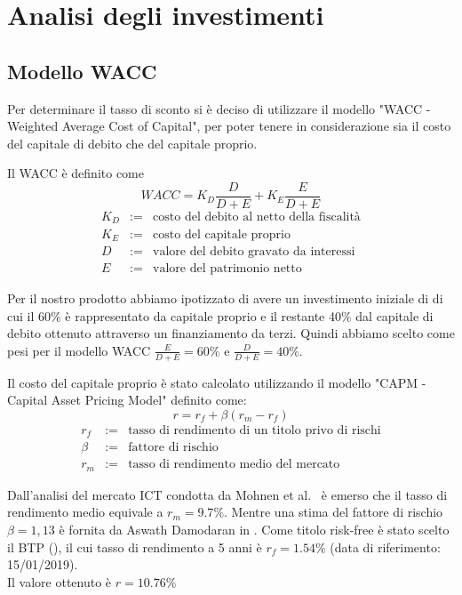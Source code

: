 \section{Analisi degli investimenti}
\subsection{Modello WACC}
Per determinare il tasso di sconto si è deciso di utilizzare il modello
"WACC - Weighted Average Cost of Capital", per poter tenere in considerazione
sia il costo del capitale di debito che del capitale proprio. 

Il WACC è definito come
\begin{displaymath}
WACC = K_D \frac{D}{D+E} + K_E \frac{E}{D+E}
\end{displaymath}
\begin{eqnarray*}
K_D &:=& \mbox{costo del debito al netto della fiscalità} \\ 
K_E &:=& \mbox{costo del capitale proprio} \\
D  &:=& \mbox{valore del debito gravato da interessi}\\
E &:=& \mbox{valore del patrimonio netto}
\end{eqnarray*}

Per il nostro prodotto abbiamo ipotizzato di avere un investimento iniziale di
 di cui il 60\% è rappresentato da capitale proprio e il restante
40\% dal capitale di debito ottenuto attraverso un finanziamento da terzi.
Quindi abbiamo scelto come pesi per il modello WACC $\frac{E}{D+E}=60\%$ e
$\frac{D}{D+E} = 40\%$.

Il costo del capitale proprio è stato calcolato utilizzando il modello "CAPM -
Capital Asset Pricing Model" definito come:
\begin{displaymath}
r = r_f + \beta (r_m - r_f )
\end{displaymath}
\begin{eqnarray*}
	r_f &:=& \mbox{tasso di rendimento di un titolo privo di rischi} \\ 
	\beta &:=& \mbox{fattore di rischio} \\
	r_m &:=& \mbox{tasso di rendimento medio del mercato}
\end{eqnarray*}

Dall'analisi del mercato ICT condotta da Mohnen et al.~\cite{avgerate} è emerso che il
tasso di rendimento medio equivale a $r_m=9.7\%$. Mentre una stima del fattore
di rischio $\beta=1,13$ è fornita da Aswath Damodaran in \cite{beta}. 
Come titolo risk-free è stato scelto il BTP (\cite{btp}), il cui tasso di 
rendimento a 5 anni è $r_f=1.54\%$ (data di riferimento: 15/01/2019).\\ 
Il valore ottenuto è $r = 10.76\%$\\


